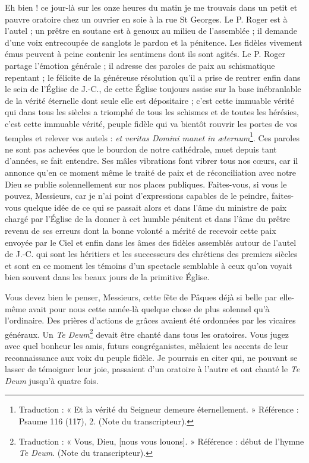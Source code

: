 Eh bien ! ce jour-là sur les onze heures du matin je me trouvais dans un petit et pauvre oratoire chez un ouvrier en soie à la rue St Georges. Le P. Roger est à l'autel ; un prêtre en soutane est à genoux au milieu de l'assemblée ; il demande d'une voix entrecoupée de sanglots le pardon et la pénitence. Les fidèles vivement émus peuvent à peine contenir les sentimens dont ils sont agités. Le
P. Roger partage l'émotion générale ; il adresse des paroles de paix au schismatique repentant ; le félicite de la généreuse résolution qu'il a prise de rentrer enfin dans le sein de l'Église de J.-C., de cette Église toujours assise sur la base inébranlable de la vérité éternelle dont seule elle est dépositaire ; c’est cette immuable vérité qui dans tous les siècles a triomphé de tous les schismes et de toutes les hérésies, c’est cette immuable vérité, peuple fidèle qui va bientôt rouvrir les portes de vos temples et relever vos autels : \textit{et veritas Domini manet in æternum}\footnote{Traduction : « Et la vérité du Seigneur demeure éternellement. » Référence : Psaume 116 (117), 2. (Note du transcripteur).}. Ces paroles ne sont pas achevées que le bourdon de notre cathédrale, muet depuis tant d'années, se fait entendre. Ses mâles vibrations font vibrer tous nos cœurs, car il annonce qu'en ce moment même le traité de paix et de réconciliation avec notre Dieu se publie solennellement sur nos places publiques. Faites-vous, si vous le pouvez, Messieurs, car je n'ai point d'expressions capables de le peindre, faites-vous quelque idée de ce qui se passait alors et dans l'âme du ministre de paix chargé par l'Église de la donner à cet humble pénitent et dans l'âme du prêtre revenu de ses erreurs dont la bonne volonté a mérité de recevoir cette paix envoyée par le Ciel et enfin dans les âmes des fidèles assemblés autour de l'autel de J.-C. qui sont les héritiers et les successeurs des chrétiens des premiers siècles et sont en ce moment les témoins d'un spectacle semblable à ceux qu'on voyait bien souvent dans les beaux jours de la primitive Église.

Vous devez bien le penser, Messieurs, cette fête de Pâques déjà si belle par elle-même avait pour nous cette année-là quelque chose de plus solennel qu'à l'ordinaire. Des prières d'actions de grâces avaient été ordonnées par les vicaires généraux. Un \textit{Te Deum}\footnote{Traduction : « Vous, Dieu, [nous vous louons]. » Référence : début de l’hymne \textit{Te Deum}. (Note du transcripteur).} devait être chanté dans tous les oratoires. Vous jugez avec quel bonheur les amis, futurs congréganistes, mêlaient les accents de leur reconnaissance aux voix du peuple fidèle. Je pourrais en citer qui, ne pouvant se lasser de témoigner leur joie, passaient d'un oratoire à l'autre et ont chanté le \textit{Te Deum} jusqu'à quatre fois.

